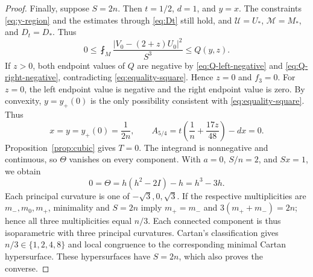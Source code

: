 \documentclass[11pt,reqno]{amsart}
\numberwithin{equation}{section}
\newcommand{\norm}[1]{\lvert #1\rvert}
\begin{document}
\begin{proof}
Finally, suppose $S=2n$. Then $t=1/2$, $d=1$, and $y=x$. The constraints \eqref{eq:y-region} and the estimates through \eqref{eq:Dt} still hold, and
$\mathcal U=U_*$, $\mathcal M=M_*$, and $D_t=D_*$. Thus
\begin{equation}\label{eq:equality-square}
0\le\fint_M\frac{\norm{V_0-(2+z)U_0}^2}{S^3}\le Q(y,z).
\end{equation}
If $z>0$, both endpoint values of $Q$ are negative by
\eqref{eq:Q-left-negative} and \eqref{eq:Q-right-negative}, contradicting
\eqref{eq:equality-square}. Hence $z=0$ and $f_3=0$.
For $z=0$, the left endpoint value is negative and the right endpoint value is zero. By convexity, $y=y_+(0)$ is the only possibility consistent with \eqref{eq:equality-square}. Thus
\[
x=y=y_+(0)=\frac1{2n},
\qquad A_{5/4}=t\left(\frac1n+\frac{17z}{48}\right)-dx=0.
\]
Proposition~\ref{prop:cubic} gives $T=0$. The integrand is nonnegative and continuous, so $\Theta$ vanishes on every component. With $a=0$, $S/n=2$, and $Sx=1$, we obtain
\[
0=\Theta=h(h^2-2I)-h=h^3-3h.
\]
Each principal curvature is one of $-\sqrt3,0,\sqrt3$.
If the respective multiplicities are $m_-,m_0,m_+$, minimality and
$S=2n$ imply $m_+=m_-$ and $3(m_++m_-)=2n$; hence all three
multiplicities equal $n/3$. Each connected component is thus isoparametric
with three principal curvatures. Cartan's classification
\cite{Cartan1939,Cecil2008} gives $n/3\in\{1,2,4,8\}$ and local congruence
to the corresponding minimal Cartan hypersurface. These hypersurfaces have $S=2n$, which also proves the converse.
\end{proof}
\end{document}
